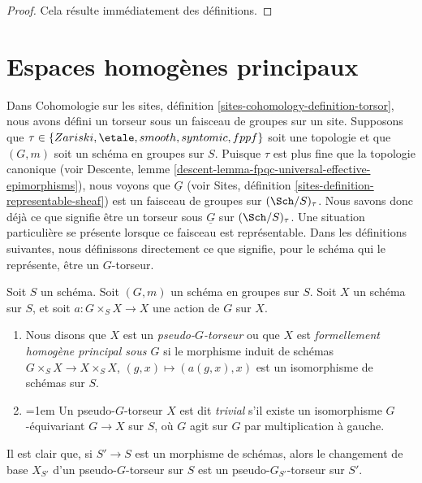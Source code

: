 \begin{proof}
Cela résulte immédiatement des définitions.
\end{proof}






\section{Espaces homogènes principaux}
\label{section-principal-homogeneous}

\noindent
Dans
Cohomologie sur les sites, définition \ref{sites-cohomology-definition-torsor},
nous avons défini un torseur sous un faisceau de groupes sur un site.
Supposons que $\tau \in\allowbreak \{Zariski,\allowbreak \etale,\allowbreak smooth,\allowbreak syntomic,\allowbreak fppf\}$ soit une
topologie et que $(G, m)$ soit un schéma en groupes sur $S$. Puisque $\tau$ est plus fine que
la topologie canonique (voir
Descente, lemme \ref{descent-lemma-fpqc-universal-effective-epimorphisms}),
nous voyons que $\underline{G}$ (voir
Sites, définition \ref{sites-definition-representable-sheaf})
est un faisceau de groupes sur $(\Sch/S)_\tau$.
Nous savons donc déjà ce que signifie être un
torseur sous $\underline{G}$ sur $(\Sch/S)_\tau$. Une situation particulière
se présente lorsque ce faisceau est représentable. Dans les définitions suivantes,
nous définissons directement ce que signifie, pour le schéma qui le représente, être un
$G$-torseur.

\begin{definition}
\label{definition-pseudo-torsor}
Soit $S$ un schéma.
Soit $(G, m)$ un schéma en groupes sur $S$.
Soit $X$ un schéma sur $S$, et soit
$a : G \times_S X \to X$ une action de $G$ sur $X$.
\begin{enumerate}
\item Nous disons que $X$ est un {\it pseudo-$G$-torseur} ou que $X$ est
{\it formellement homogène principal sous $G$} si le
morphisme induit de schémas $G \times_S X \to X \times_S X$,
$(g, x) \mapsto (a(g, x), x)$ est un isomorphisme de schémas sur $S$.
\item {\emergencystretch=1em Un pseudo-$G$-torseur $X$ est dit {\it trivial} s'il existe
un isomorphisme $G$-équivariant $G \to X$ sur $S$, où $G$ agit sur
$G$ par multiplication à gauche.\par}
\end{enumerate}
\end{definition}

\noindent
Il est clair que, si $S' \to S$ est un morphisme de schémas, alors
le changement de base $X_{S'}$ d'un pseudo-$G$-torseur sur $S$ est un
pseudo-$G_{S'}$-torseur sur $S'$.


